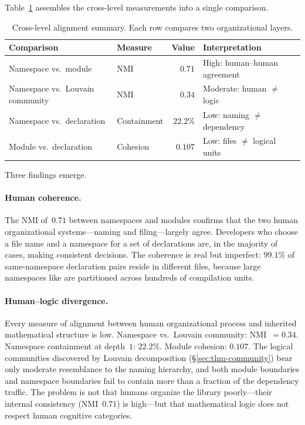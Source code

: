 Table~\ref{tab:three-layers-app} assembles the cross-level measurements into a single comparison.

\begin{table}[ht]
\centering
\caption{Cross-level alignment summary. Each row compares two organizational layers.}
\label{tab:three-layers-app}
\begin{tabular}{llrl}
\toprule
Comparison & Measure & Value & Interpretation \\
\midrule
Namespace vs.\ module            & NMI          & $0.71$  & High: human--human agreement \\
Namespace vs.\ Louvain community & NMI          & $0.34$  & Moderate: human $\neq$ logic \\
Namespace vs.\ declaration       & Containment  & $22.2\%$ & Low: naming $\neq$ dependency \\
Module vs.\ declaration          & Cohesion     & $0.107$ & Low: files $\neq$ logical units \\
\bottomrule
\end{tabular}
\end{table}

Three findings emerge.

\paragraph{Human coherence.} The NMI of~$0.71$ between namespaces and modules confirms that the two human organizational systems---naming and filing---largely agree. Developers who choose a file name and a namespace for a set of declarations are, in the majority of cases, making consistent decisions. The coherence is real but imperfect: $99.1\%$ of same-namespace declaration pairs reside in different files, because large namespaces like  are partitioned across hundreds of compilation units.

\paragraph{Human--logic divergence.} Every measure of alignment between human organizational process and inherited mathematical structure is low. Namespace vs.\ Louvain community: NMI~$= 0.34$. Namespace containment at depth~$1$: $22.2\%$. Module cohesion: $0.107$. The logical communities discovered by Louvain decomposition (\S\ref{sec:thm-community}) bear only moderate resemblance to the naming hierarchy, and both module boundaries and namespace boundaries fail to contain more than a fraction of the dependency traffic. The problem is not that humans organize the library poorly---their internal consistency (NMI~$0.71$) is high---but that mathematical logic does not respect human cognitive categories.

